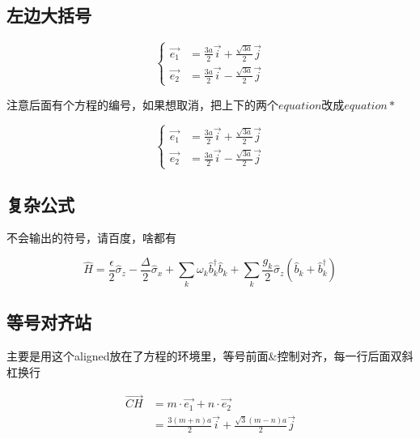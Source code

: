\documentclass[AutoFakeBold]{LZUThesis2007}
\begin{document}
\subsection{左边大括号} %
\label{sub:左边大括号}

\begin{equation}
    \left\{
    \begin{array}{rcl}
        \vec{e_1} &= \frac{3a}{2} \vec{i} + \frac{\sqrt{3a}}{2} \vec{j} \\
        \vec{e_2} &= \frac{3a}{2} \vec{i} - \frac{\sqrt{3a}}{2} \vec{j}
    \end{array}
    \right.
    \label{e1e2}
\end{equation}

注意后面有个方程的编号，如果想取消，把上下的两个$equation$改成$equation*$

\begin{equation*}
    \left\{
    \begin{array}{rcl}
        \vec{e_1} &= \frac{3a}{2} \vec{i} + \frac{\sqrt{3a}}{2} \vec{j} \\
        \vec{e_2} &= \frac{3a}{2} \vec{i} - \frac{\sqrt{3a}}{2} \vec{j}
    \end{array}
    \right.
    \label{e1e2_2}
\end{equation*}


\subsection{复杂公式} %
\label{sub:复杂公式}
不会输出的符号，请百度，啥都有

\begin{equation}
\hat{H}=\frac{\epsilon}{2}\hat{\sigma}_{z}-\frac{\Delta}{2}\hat{\sigma}_{x}+\sum_{k}\omega_{k}\hat{b}_{k}^{\dagger}\hat{b}_{k}+\sum_{k}\frac{g_{k}}{2}\hat{\sigma}_{z}(\hat{b}_{k}+\hat{b}_{k}^{\dagger})\label{eq:sbm}
\end{equation}



\subsection{等号对齐站} %
\label{sub:等号对齐站}

主要是用这个aligned放在了方程的环境里，等号前面\&控制对齐，每一行后面双斜杠换行

\begin{equation}
    \begin{aligned}
        \vec{CH} & = m\cdot \vec{e_1} + n\cdot \vec{e_2} \\
        & = \frac{3(m+n)a}{2} \vec{i} + \frac{\sqrt{3}(m-n)a}{2} \vec{j} 
    \end{aligned}
    \label{ch}
\end{equation}
\end{document}

